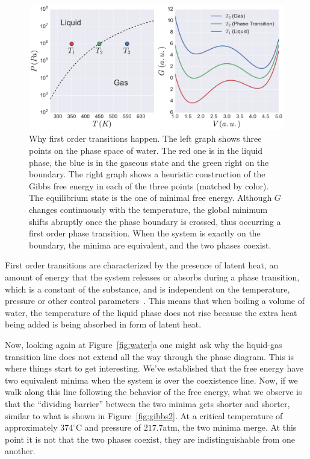 \begin{figure}
\begin{center}
    \includegraphics[width=\textwidth]{chapters/ch2-crit/figs/gibbs1}
\end{center}
\caption{Why first order transitions happen. The left graph shows three points
    on the phase space of water. The red one is in the liquid phase, the blue
    is in the gaseous state and the green right on the boundary. The right
    graph shows a heuristic construction of the Gibbs free energy in each of
    the three points (matched by color). The equilibrium state is the one of
    minimal free energy. Although $G$ changes continuously with the
    temperature, the global minimum shifts abruptly once the phase boundary is
    crossed, thus occurring a first order phase transition. When the system is
    exactly on the boundary, the minima are equivalent, and the two phases
    coexist.}
\label{fig:gibbs1}
\end{figure}


First order transitions are characterized by the presence of latent heat, an
amount of energy that the system releases or absorbs during a phase transition,
which is a constant of the substance, and is independent on the temperature,
pressure or other control parameters~\cite{Callen1985}. This means that when
boiling a volume of water, the temperature of the liquid phase does not rise
because the extra heat being added is being absorbed in form of latent heat.

Now, looking again at Figure~\ref{fig:water}a one might ask why the liquid-gas
transition line does not extend all the way through the phase diagram. This
is where things start to get interesting. We've established that the free
energy have two equivalent minima when the system is over the coexistence line.
Now, if we walk along this line following the behavior of the free energy, what
we observe is that the ``dividing barrier'' between  the two minima gets shorter
and shorter, similar to what is shown in Figure~\ref{fig:gibbs2}. At a critical
temperature of approximately $374^\circ$C and pressure of $217.7$atm, the two
minima merge. At this point it is not that the two phases coexist, they are
indistinguishable from one another.

